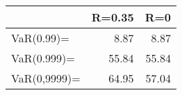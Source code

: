 \begin{tabular}{lrr}
\toprule
    &  R=0.35 &    R=0 \\
\midrule
   VaR(0.99)= &    8.87 &   8.87 \\
  VaR(0.999)= &   55.84 &  55.84 \\
 VaR(0,9999)= &   64.95 &  57.04 \\
\bottomrule
\end{tabular}
